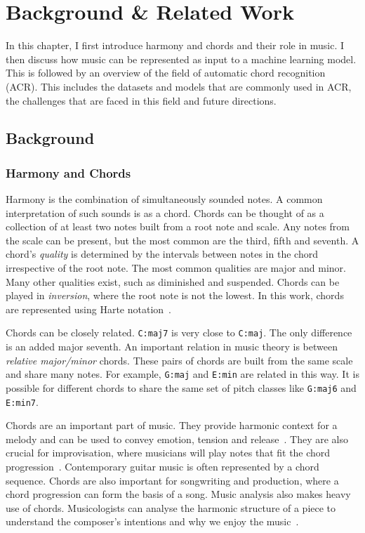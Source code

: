 \chapter{Background \& Related Work}

In this chapter, I first introduce harmony and chords and their role in music. I then discuss how music can be represented as input to a machine learning model. This is followed by an overview of the field of automatic chord recognition (ACR). This includes the datasets and models that are commonly used in ACR, the challenges that are faced in this field and future directions.

\section{Background}

\subsection{Harmony and Chords}

Harmony is the combination of simultaneously sounded notes. A common interpretation of such sounds is as a chord. Chords can be thought of as a collection of at least two notes built from a root note and scale. Any notes from the scale can be present, but the most common are the third, fifth and seventh. A chord's \emph{quality} is determined by the intervals between notes in the chord irrespective of the root note. The most common qualities are major and minor. Many other qualities exist, such as diminished and suspended. Chords can be played in \emph{inversion}, where the root note is not the lowest. In this work, chords are represented using Harte notation~\citep{HarteNotation}.

Chords can be closely related. \texttt{C:maj7} is very close to \texttt{C:maj}. The only difference is an added major seventh. An important relation in music theory is between \emph{relative major/minor} chords. These pairs of chords are built from the same scale and share many notes. For example, \texttt{G:maj} and \texttt{E:min} are related in this way. It is possible for different chords to share the same set of pitch classes like \texttt{G:maj6} and \texttt{E:min7}.

Chords are an important part of music. They provide harmonic context for a melody and can be used to convey emotion, tension and release~\citep{HarmonyandVoiceLeading}. They are also crucial for improvisation, where musicians will play notes that fit the chord progression~\citep{JazzTheoryBook}. Contemporary guitar music is often represented by a chord sequence. Chords are also important for songwriting and production, where a chord progression can form the basis of a song. Music analysis also makes heavy use of chords. Musicologists can analyse the harmonic structure of a piece to understand the composer's intentions and why we enjoy the music~\citep{TonalAnalysisBach}.

